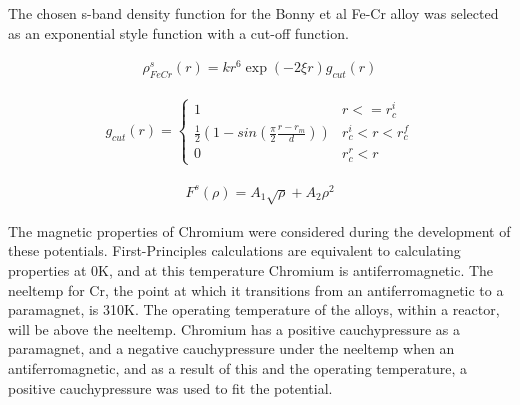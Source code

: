 The chosen s-band density function for the Bonny et al Fe-Cr alloy was selected as an exponential style function with a cut-off function.

\begin{equation}
\begin{split}
\rho_{FeCr}^{s} (r) = k r^6 \exp(-2 \xi r) g_{cut} (r)
\end{split}
\label{eq:fecrsbanddensity}
\end{equation}

\begin{equation}
\begin{split}
g_{cut} (r) = \left\{ \begin{matrix} 1 & r <= r_c^i \\  \frac{1}{2}\left(1 - sin(\frac{\pi}{2} \frac{r-r_m}{d}) \right) & r_c^i < r < r_c^f \\ 0 & r_c^r < r \end{matrix} \right . 
\end{split}
\label{eq:fecrsbanddensitycutoff}
\end{equation}

\begin{equation}
\begin{split}
F^s(\rho) = A_1 \sqrt{\rho} + A_2 \rho^2
\end{split}
\label{eq:fecrsbandembedding}
\end{equation}

The magnetic properties of Chromium were considered during the development of these potentials.  First-Principles calculations are equivalent to calculating properties at 0K, and at this temperature Chromium is \gls{antiferromagnetic}.  The \Gls{neeltemp} for Cr, the point at which it transitions from an antiferromagnetic to a paramagnet, is 310K.  The operating temperature of the alloys, within a reactor, will be above the \Gls{neeltemp}.  Chromium has a positive \Gls{cauchypressure} as a paramagnet, and a negative \Gls{cauchypressure} under the \Gls{neeltemp} when an \gls{antiferromagnetic}, and as a result of this and the operating temperature, a positive \Gls{cauchypressure} was used to fit the potential.










